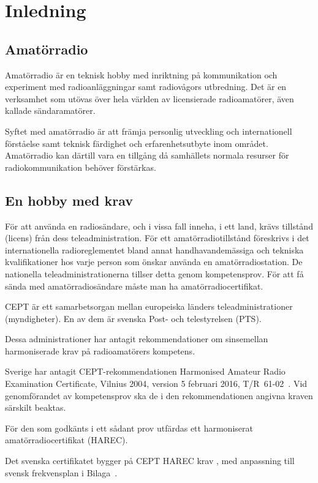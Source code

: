\chapter*{Inledning}

\section*{Amatörradio}

Amatörradio är en teknisk hobby med inriktning på kommunikation och experiment
med radioanläggningar samt radiovågors utbredning.
Det är en verksamhet som utövas över hela världen av licensierade radioamatörer,
även kallade sändaramatörer.

Syftet med amatörradio är att främja personlig utveckling och internationell
förståelse samt teknisk färdighet och erfarenhetsutbyte inom området.
Amatörradio kan därtill vara en tillgång då samhällets normala resurser för
radiokommunikation behöver förstärkas.

\section*{En hobby med krav}

För att använda en radiosändare, och i vissa fall inneha, i ett land, krävs
tillstånd (licens) från dess teleadministration.
För ett amatörradiotillstånd föreskrivs i det internationella radioreglementet
\cite{ITU-RR} bland annat handhavandemässiga och tekniska kvalifikationer hos
varje person som önskar använda en amatörradiostation.
De nationella teleadministrationerna tillser detta genom kompetensprov.
För att få sända med amatörradiosändare måste man ha amatörradiocertifikat.

CEPT är ett samarbetsorgan mellan europeiska länders teleadministrationer
(myndigheter).
En av dem är svenska Post- och telestyrelsen (PTS).

Dessa administrationer har antagit rekommendationer om sinsemellan
harmoniserade krav på radioamatörers kompetens.

Sverige har antagit CEPT-rekom\-men\-da\-ti\-on\-en
 Ha\-rmonised Amateur Radio Examination
Certificate, Vilnius 2004, version 5 februari 2016, T/R~61-02~\cite{TR6102}.
Vid genomförandet av kompetensprov ska de i den rekommendationen
angivna kraven särskilt beaktas.

För den som godkänts i ett sådant prov utfärdas ett harmoniserat
amatörradiocertifikat (HAREC).

Det svenska certifikatet bygger på CEPT HAREC krav \cite{TR6102},
med anpassning till svensk frekvensplan i Bilaga~.

